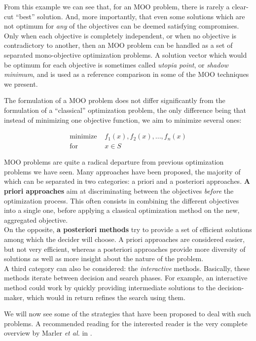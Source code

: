 From this example we can see that, for an MOO problem, there is rarely a clear-cut \enquote{best} solution. And, more importantly, that even some solutions which are not optimum for \emph{any} of the objectives can be deemed satisfying compromises. Only when each objective is completely independent, or when no objective is contradictory to another, then an MOO problem can be handled as a set of separated mono-objective optimization problems.
A solution vector which would be optimum for each objective is sometimes called \emph{utopia point}, or \emph{shadow minimum}, and is used as a reference comparison in some of the MOO techniques we present.

The formulation of a MOO problem does not differ significantly from the formulation of a \enquote{classical} optimization problem, the only difference being that instead of minimizing one objective function, we aim to minimize several ones:

\begin{align*}
\text{minimize } & f_1(x), f_2(x), ..., f_n(x)\\
\text{for } & x \in S
\end{align*}

MOO problems are quite a radical departure from previous optimization problems we have seen. Many approaches have been proposed, the majority of which can be separated in two categories: a priori and a posteriori approaches. \textbf{A priori approaches} aim at discriminating between the objectives \emph{before} the optimization process. This often consists in combining the different objectives into a single one, before applying a classical optimization method on the new, aggregated objective.\\
On the opposite, \textbf{a posteriori methods} try to provide a set of efficient solutions among which the decider will choose.
A priori approaches are considered easier, but not very efficient, whereas a posteriori approaches provide more diversity of solutions as well as more insight about the nature of the problem.\\
A third category can also be considered: the \emph{interactive} methods. Basically, these methods iterate between decision and search phases. For example, an interactive method could work by quickly providing intermediate solutions to the decision-maker, which would in return refines the search using them.

We will now see some of the strategies that have been proposed to deal with such problems. A recommended reading for the interested reader is the very complete overview by Marler \emph{et al.} in \cite{marler2004survey}. 

